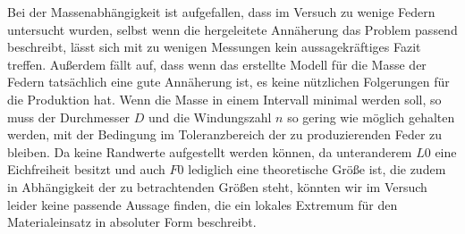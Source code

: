 Bei der Massenabhängigkeit ist aufgefallen, dass im Versuch zu wenige Federn untersucht wurden, selbst wenn die hergeleitete Annäherung das Problem passend beschreibt, 
lässt sich mit zu wenigen Messungen kein aussagekräftiges Fazit treffen.
Außerdem fällt auf, dass wenn das erstellte Modell für die Masse der Federn tatsächlich eine gute Annäherung ist, es keine nützlichen Folgerungen für die Produktion hat.
Wenn die Masse in einem Intervall minimal werden soll, so muss der Durchmesser $D$ und die Windungszahl $n$ so gering wie möglich gehalten werden, mit der Bedingung im Toleranzbereich der zu produzierenden Feder zu bleiben.
Da keine Randwerte aufgestellt werden können, da unteranderem $L0$ eine Eichfreiheit besitzt und auch $F0$
lediglich eine theoretische Größe ist, die zudem in Abhängigkeit der zu betrachtenden Größen steht,
könnten wir im Versuch leider keine passende Aussage finden, die ein lokales Extremum für den Materialeinsatz in 
absoluter Form beschreibt.


